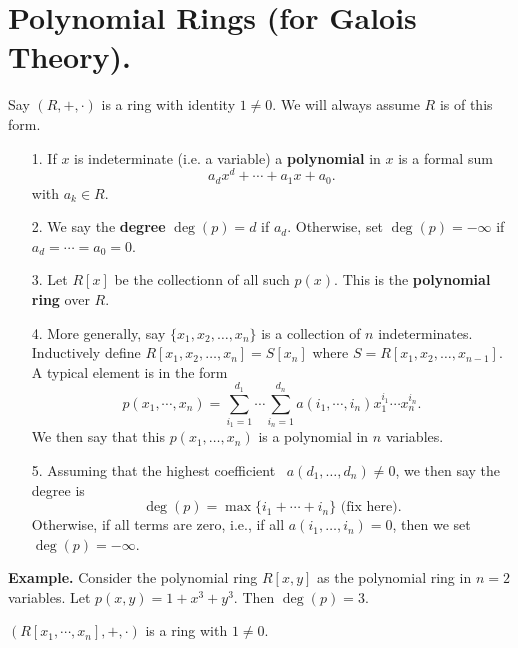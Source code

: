 \section{Polynomial Rings (for Galois Theory).}

\begin{definition}
    Say $(R, +, \cdot)$ is a ring with identity $1 \ne 0$. We will
    always assume $R$ is of this form. 
    \begin{itemize}
        \item[1.] If $x$  is indeterminate (i.e. a variable) a
        \textbf{polynomial} in $x$ is a formal sum 
        \[
            a_dx^d + \cdots + a_1x + a_0.
        \]
        with $a_k \in R$.
        \item[2.] We say the \textbf{degree} $\deg(p) = d$ if $a_d$.
        Otherwise, set  $\deg(p) = -\infty$ if $a_d = \cdots = a_0
        = 0$.
        \item[3.] Let $R[x]$ be the collectionn of all such
        $p(x)$. This is the \textbf{polynomial ring} over $R$.
        \item[4.] More generally, say $\{x_1, x_2, \dots, x_n\}$
        is a collection of $n$ indeterminates. Inductively define
        $R[x_1, x_2, \dots, x_n] = S[x_n]$ where $S = R[x_1, x_2,
        \dots, x_{n-1}]$. A typical element is in the form 
        \[
            p(x_1, \cdots, x_n) = \sum_{i_1 =  1}^{d_1}\cdots\sum_{i_n = 1}^{d_n}a(i_1, \cdots, i_n)x_1^{i_1}\cdots x_n^{i_n}.
        \] 
        We then say that this $p(x_1, \dots, x_n)$ is a polynomial
        in $n$ variables. 
        \item[5.] Assuming that the highest coefficient
        \    $a(d_1, \dots, d_n) \ne 0$, we then say the degree is
        \[
            \deg(p) = \max\{i_1  + \cdots + i_n\} \text{ (fix here)}.                
        \]
        Otherwise, if all terms are zero, i.e., if all $a(i_1,
        \dots, i_n) = 0$, then we set $\deg(p) = -\infty$.
    \end{itemize}
\end{definition}

\textbf{Example.}
Consider the polynomial ring $R[x, y]$ as the polynomial ring in
$n = 2$ variables. Let $p(x, y) = 1 + x^3 + y^3$. Then $\deg(p) =
3$. 

\begin{proposition}
    $(R[x_1, \cdots, x_n], + , \cdot)$ is a ring with $1 \ne 0$.
\end{proposition}

